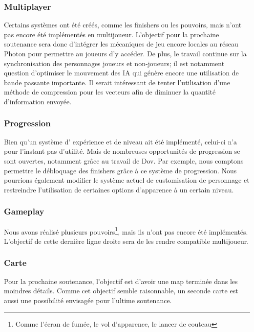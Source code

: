	\subsubsection{Multiplayer}
	Certains systèmes ont été créés, comme les finishers ou les pouvoirs, mais n'ont pas encore été 
	implémentés en multijoueur. L'objectif pour la prochaine soutenance sera donc d'intégrer les mécaniques 
	de jeu encore locales au réseau Photon pour permettre au joueurs d'y accéder. De plus, le 
	travail continue sur la synchronisation des personnages joueurs et non-joueurs;  il est notamment 
	question d'optimiser le mouvement des IA qui génère encore une utilisation de bande passante importante. 
	Il serait intéressant de tenter l'utilisation d'une méthode de compression pour les vecteurs afin de diminuer 
	la quantité d'information envoyée.

	\subsubsection{Progression}
		Bien qu'un système d' expérience et de niveau ait été implémenté, celui-ci n'a pour 
		l'instant pas d'utilité. Mais de nombreuses opportunités de progression se sont ouvertes, 
		notamment grâce au travail de Dov. Par exemple, nous comptons permettre le débloquage des 
		finishers grâce à ce système de progression. Nous pourrions également modifier le système actuel 
		de customisation de personnage et restreindre l'utilisation de certaines options d'apparence à un certain niveau.

	\subsubsection{Gameplay}

	Nous avons réalisé plusieurs pouvoirs\footnote{Comme l'écran de fumée, le vol d'apparence, le lancer de couteau}, mais ils n'ont pas encore été implémentés.
	L'objectif de cette dernière ligne droite sera de les rendre compatible multijoueur.
	
	\subsubsection{Carte}

	Pour la prochaine soutenance, l'objectif est d'avoir une map terminée dans les moindres 
	détails. Comme cet objectif semble raisonnable, un seconde carte est aussi une possibilité 
	envisagée pour l'ultime soutenance.